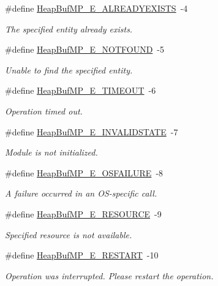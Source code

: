 \begin{DoxyCompactItemize}
\#define \hyperlink{_heap_buf_m_p_8h_a27b1533d0d529ecdd7d6a7d7090aa5a7}{HeapBufMP\_\-E\_\-ALREADYEXISTS}~-\/4
\begin{DoxyCompactList}\small\item\em The specified entity already exists. \item\end{DoxyCompactList}\item 
\#define \hyperlink{_heap_buf_m_p_8h_a413c47cfb2257df264b84951abc0409f}{HeapBufMP\_\-E\_\-NOTFOUND}~-\/5
\begin{DoxyCompactList}\small\item\em Unable to find the specified entity. \item\end{DoxyCompactList}\item 
\#define \hyperlink{_heap_buf_m_p_8h_aa2bf7936fb8db078713544c7ee1197fd}{HeapBufMP\_\-E\_\-TIMEOUT}~-\/6
\begin{DoxyCompactList}\small\item\em Operation timed out. \item\end{DoxyCompactList}\item 
\#define \hyperlink{_heap_buf_m_p_8h_a72fbd9726f36a122c3462ab151e67518}{HeapBufMP\_\-E\_\-INVALIDSTATE}~-\/7
\begin{DoxyCompactList}\small\item\em Module is not initialized. \item\end{DoxyCompactList}\item 
\#define \hyperlink{_heap_buf_m_p_8h_a7b0421d7bd809415074b1483f044162f}{HeapBufMP\_\-E\_\-OSFAILURE}~-\/8
\begin{DoxyCompactList}\small\item\em A failure occurred in an OS-\/specific call. \item\end{DoxyCompactList}\item 
\#define \hyperlink{_heap_buf_m_p_8h_a7354bfdbab3d4d028d0c6d48edd308a7}{HeapBufMP\_\-E\_\-RESOURCE}~-\/9
\begin{DoxyCompactList}\small\item\em Specified resource is not available. \item\end{DoxyCompactList}\item 
\#define \hyperlink{_heap_buf_m_p_8h_a445c7db0d4aa1939dc33cefe24f6c4df}{HeapBufMP\_\-E\_\-RESTART}~-\/10
\begin{DoxyCompactList}\small\item\em Operation was interrupted. Please restart the operation. \item\end{DoxyCompactList}\end{DoxyCompactItemize}
